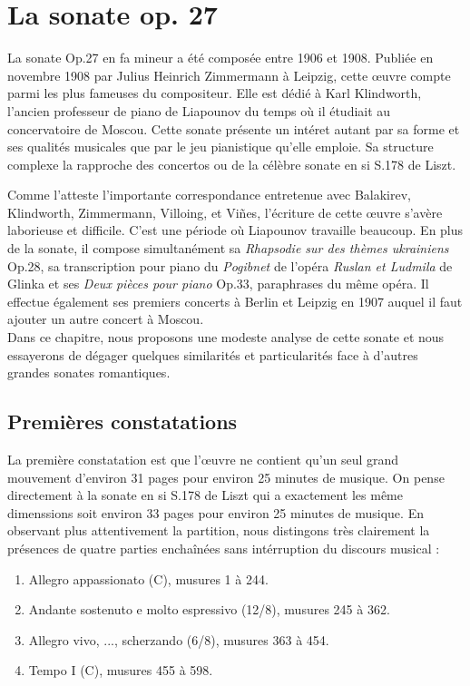 
\chapter{La sonate op. 27}

La sonate Op.27 en fa mineur a été composée entre 1906 et 1908. Publiée en novembre 1908 par Julius Heinrich Zimmermann à Leipzig, cette œuvre compte parmi les plus fameuses du compositeur. Elle est dédié à Karl Klindworth, l'ancien professeur de piano de Liapounov du temps où il étudiait au concervatoire de Moscou. Cette sonate présente un intéret autant par sa forme et ses qualités musicales que par le jeu pianistique qu'elle emploie. Sa structure complexe la rapproche des concertos ou de la célèbre sonate en si S.178 de Liszt.

Comme l'atteste l'importante correspondance entretenue avec Balakirev, Klindworth, Zimmermann, Villoing, et Viñes, l'écriture de cette œuvre s'avère laborieuse et difficile. C'est une période où Liapounov travaille beaucoup. En plus de la sonate, il compose simultanément sa \emph{Rhapsodie sur des thèmes ukrainiens} Op.28, sa transcription pour piano du \emph{Pogibnet} de l'opéra \emph{Ruslan et Ludmila} de Glinka et ses \emph{Deux pièces pour piano} Op.33, paraphrases du même opéra. Il effectue également ses premiers concerts à Berlin et Leipzig en 1907 auquel il faut ajouter un autre concert à Moscou.\\

Dans ce chapitre, nous proposons une modeste analyse de cette sonate et nous essayerons de dégager quelques similarités et particularités face à d'autres grandes sonates romantiques.

\section{Premières constatations}

La première constatation est que l'œuvre ne contient qu'un seul grand mouvement d'environ 31 pages pour environ 25 minutes de musique. On pense directement à la sonate en si S.178 de Liszt qui a exactement les même dimenssions soit environ 33 pages pour environ 25 minutes de musique. En observant plus attentivement la partition, nous distingons très clairement la présences de quatre parties enchaînées sans intérruption du discours musical :
\begin{enumerate}
  \item Allegro appassionato (C), musures 1 à 244.
  \item Andante sostenuto e molto espressivo (12/8), musures 245 à 362.
  \item Allegro vivo, ..., scherzando (6/8), musures 363 à 454.
  \item Tempo I (C), musures 455 à 598.\\
\end{enumerate}


